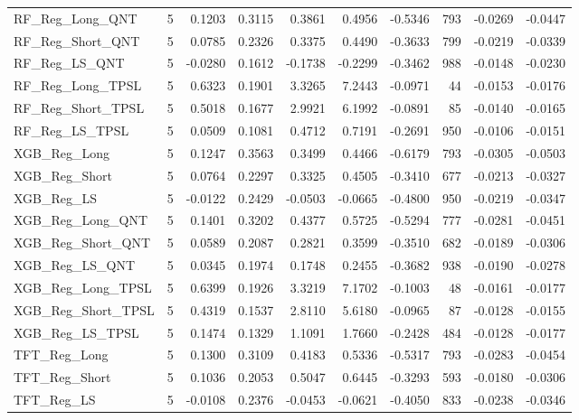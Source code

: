 \begin{tabular}{llrrrrrrrr}
\cline{1-10}
RF\_Reg\_Long\_QNT & 5 & 0.1203 & 0.3115 & 0.3861 & 0.4956 & -0.5346 & 793 & -0.0269 & -0.0447 \\
\cline{1-10}
RF\_Reg\_Short\_QNT & 5 & 0.0785 & 0.2326 & 0.3375 & 0.4490 & -0.3633 & 799 & -0.0219 & -0.0339 \\
\cline{1-10}
RF\_Reg\_LS\_QNT & 5 & -0.0280 & 0.1612 & -0.1738 & -0.2299 & -0.3462 & 988 & -0.0148 & -0.0230 \\
\cline{1-10}
RF\_Reg\_Long\_TPSL & 5 & 0.6323 & 0.1901 & 3.3265 & 7.2443 & -0.0971 & 44 & -0.0153 & -0.0176 \\
\cline{1-10}
RF\_Reg\_Short\_TPSL & 5 & 0.5018 & 0.1677 & 2.9921 & 6.1992 & -0.0891 & 85 & -0.0140 & -0.0165 \\
\cline{1-10}
RF\_Reg\_LS\_TPSL & 5 & 0.0509 & 0.1081 & 0.4712 & 0.7191 & -0.2691 & 950 & -0.0106 & -0.0151 \\
\cline{1-10}
XGB\_Reg\_Long & 5 & 0.1247 & 0.3563 & 0.3499 & 0.4466 & -0.6179 & 793 & -0.0305 & -0.0503 \\
\cline{1-10}
XGB\_Reg\_Short & 5 & 0.0764 & 0.2297 & 0.3325 & 0.4505 & -0.3410 & 677 & -0.0213 & -0.0327 \\
\cline{1-10}
XGB\_Reg\_LS & 5 & -0.0122 & 0.2429 & -0.0503 & -0.0665 & -0.4800 & 950 & -0.0219 & -0.0347 \\
\cline{1-10}
XGB\_Reg\_Long\_QNT & 5 & 0.1401 & 0.3202 & 0.4377 & 0.5725 & -0.5294 & 777 & -0.0281 & -0.0451 \\
\cline{1-10}
XGB\_Reg\_Short\_QNT & 5 & 0.0589 & 0.2087 & 0.2821 & 0.3599 & -0.3510 & 682 & -0.0189 & -0.0306 \\
\cline{1-10}
XGB\_Reg\_LS\_QNT & 5 & 0.0345 & 0.1974 & 0.1748 & 0.2455 & -0.3682 & 938 & -0.0190 & -0.0278 \\
\cline{1-10}
XGB\_Reg\_Long\_TPSL & 5 & 0.6399 & 0.1926 & 3.3219 & 7.1702 & -0.1003 & 48 & -0.0161 & -0.0177 \\
\cline{1-10}
XGB\_Reg\_Short\_TPSL & 5 & 0.4319 & 0.1537 & 2.8110 & 5.6180 & -0.0965 & 87 & -0.0128 & -0.0155 \\
\cline{1-10}
XGB\_Reg\_LS\_TPSL & 5 & 0.1474 & 0.1329 & 1.1091 & 1.7660 & -0.2428 & 484 & -0.0128 & -0.0177 \\
\cline{1-10}
TFT\_Reg\_Long & 5 & 0.1300 & 0.3109 & 0.4183 & 0.5336 & -0.5317 & 793 & -0.0283 & -0.0454 \\
\cline{1-10}
TFT\_Reg\_Short & 5 & 0.1036 & 0.2053 & 0.5047 & 0.6445 & -0.3293 & 593 & -0.0180 & -0.0306 \\
\cline{1-10}
TFT\_Reg\_LS & 5 & -0.0108 & 0.2376 & -0.0453 & -0.0621 & -0.4050 & 833 & -0.0238 & -0.0346 \\

\end{tabular}
